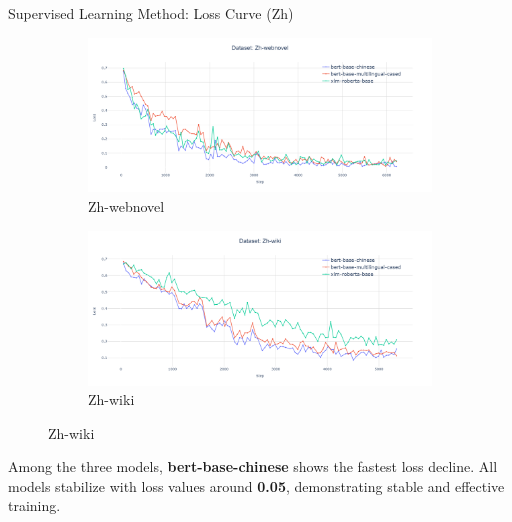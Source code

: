 \documentclass[serif]{beamer}
\begin{document}
\begin{frame}{Supervised Learning Method: Loss Curve (Zh)}
\begin{figure}[htbp]
    \vspace{-0.2em}  %

    \begin{subfigure}[b]{0.44\linewidth}
        \centering
        \includegraphics[width=\linewidth]{images/zh-webnovel.png}
        \caption{Zh-webnovel}
        \label{fig:en-reuter}
    \end{subfigure}
    \hfill
    \begin{subfigure}[b]{0.44\linewidth}
        \centering
        \includegraphics[width=\linewidth]{images/zh-wiki.png}
        \caption{Zh-wiki}
        \label{fig:en-wp}
    \end{subfigure}

    \label{fig:four-plots}
\end{figure}
\vspace{-0.2em}
\footnotesize
Among the three models, \textbf{bert-base-chinese} shows the fastest loss decline. All models stabilize with loss values around \textbf{0.05}, demonstrating stable and effective training.
\end{frame}
\end{document}
